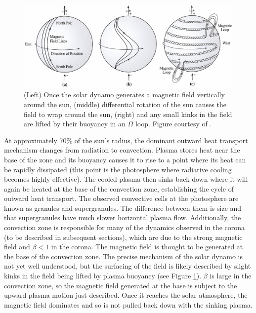 \begin{figure}[!h]
    \begin{center}
	    \includegraphics[width=\textwidth]{Images/MagneticFieldGeneration.png}
    \end{center}
    \caption[Surfacing of magnetic field]{
        (Left) Once the solar dynamo generates a magnetic field vertically around the sun, (middle) differential rotation 
        of the sun causes the field to wrap around the sun, (right) and any small kinks in the field are lifted by their 
        buoyancy in an $\Omega$ loop. Figure courtesy of \citet{Lang2001}.       
    }
    \label{fig:magfieldgeneration}
\end{figure}

At approximately 70\% of the sun's radius, the dominant outward heat transport mechanism changes from radiation to convection. Plasma stores heat near the base of the zone and its buoyancy causes it to rise to a point where its heat can be rapidly dissipated (this point is the photosphere where radiative cooling becomes highly effective). The cooled plasma then sinks back down where it will again be heated at the base of the convection zone, establishing the cycle of outward heat transport. The observed convective cells at the photosphere are known as granules and supergranules. The difference between them is size and that supergranules have much slower horizontal plasma flow. Additionally, the convection zone is responsible for many of the dynamics observed in the corona (to be described in subsequent sections), which are due to the strong magnetic field and $\beta < 1$ in the corona. The magnetic field is thought to be generated at the base of the convection zone. The precise mechanism of the solar dynamo is not yet well understood, but the surfacing of the field is likely described by slight kinks in the field being lifted by plasma buoyancy (see Figure \ref{fig:magfieldgeneration}). 
$\beta$ is large in the convection zone, so the magnetic field generated at the base is subject to the upward plasma motion just described. Once it reaches the solar atmosphere, the magnetic field dominates and so is not pulled back down with the sinking plasma. 

